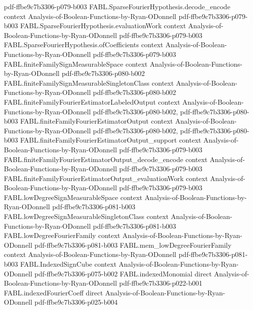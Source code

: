 \begin{theorem}
  {pdf-ffbe9c7b3306-p079-b003}
\proofstep
  {FABL.SparseFourierHypothesis.decode_encode}
  {context}
  {Analysis-of-Boolean-Functions-by-Ryan-ODonnell}
  {pdf-ffbe9c7b3306-p079-b003}
\proofstep
  {FABL.SparseFourierHypothesis.evaluationWork}
  {context}
  {Analysis-of-Boolean-Functions-by-Ryan-ODonnell}
  {pdf-ffbe9c7b3306-p079-b003}
\proofstep
  {FABL.SparseFourierHypothesis.ofCoefficients}
  {context}
  {Analysis-of-Boolean-Functions-by-Ryan-ODonnell}
  {pdf-ffbe9c7b3306-p079-b003}
\proofstep
  {FABL.finiteFamilySignMeasurableSpace}
  {context}
  {Analysis-of-Boolean-Functions-by-Ryan-ODonnell}
  {pdf-ffbe9c7b3306-p080-b002}
\proofstep
  {FABL.finiteFamilySignMeasurableSingletonClass}
  {context}
  {Analysis-of-Boolean-Functions-by-Ryan-ODonnell}
  {pdf-ffbe9c7b3306-p080-b002}
\proofstep
  {FABL.finiteFamilyFourierEstimatorLabeledOutput}
  {context}
  {Analysis-of-Boolean-Functions-by-Ryan-ODonnell}
  {pdf-ffbe9c7b3306-p080-b002,
    pdf-ffbe9c7b3306-p080-b003}
\proofstep
  {FABL.finiteFamilyFourierEstimatorOutput}
  {context}
  {Analysis-of-Boolean-Functions-by-Ryan-ODonnell}
  {pdf-ffbe9c7b3306-p080-b002,
    pdf-ffbe9c7b3306-p080-b003}
\proofstep
  {FABL.finiteFamilyFourierEstimatorOutput_support}
  {context}
  {Analysis-of-Boolean-Functions-by-Ryan-ODonnell}
  {pdf-ffbe9c7b3306-p079-b003}
\proofstep
  {FABL.finiteFamilyFourierEstimatorOutput_decode_encode}
  {context}
  {Analysis-of-Boolean-Functions-by-Ryan-ODonnell}
  {pdf-ffbe9c7b3306-p079-b003}
\proofstep
  {FABL.finiteFamilyFourierEstimatorOutput_evaluationWork}
  {context}
  {Analysis-of-Boolean-Functions-by-Ryan-ODonnell}
  {pdf-ffbe9c7b3306-p079-b003}
\proofstep
  {FABL.lowDegreeSignMeasurableSpace}
  {context}
  {Analysis-of-Boolean-Functions-by-Ryan-ODonnell}
  {pdf-ffbe9c7b3306-p081-b003}
\proofstep
  {FABL.lowDegreeSignMeasurableSingletonClass}
  {context}
  {Analysis-of-Boolean-Functions-by-Ryan-ODonnell}
  {pdf-ffbe9c7b3306-p081-b003}
\proofstep
  {FABL.lowDegreeFourierFamily}
  {context}
  {Analysis-of-Boolean-Functions-by-Ryan-ODonnell}
  {pdf-ffbe9c7b3306-p081-b003}
\proofstep
  {FABL.mem_lowDegreeFourierFamily}
  {context}
  {Analysis-of-Boolean-Functions-by-Ryan-ODonnell}
  {pdf-ffbe9c7b3306-p081-b003}
\proofstep
  {FABL.IndexedSignCube}
  {context}
  {Analysis-of-Boolean-Functions-by-Ryan-ODonnell}
  {pdf-ffbe9c7b3306-p075-b002}
\proofstep
  {FABL.indexedMonomial}
  {direct}
  {Analysis-of-Boolean-Functions-by-Ryan-ODonnell}
  {pdf-ffbe9c7b3306-p022-b001}
\proofstep
  {FABL.indexedFourierCoeff}
  {direct}
  {Analysis-of-Boolean-Functions-by-Ryan-ODonnell}
  {pdf-ffbe9c7b3306-p025-b004}

\end{theorem}
